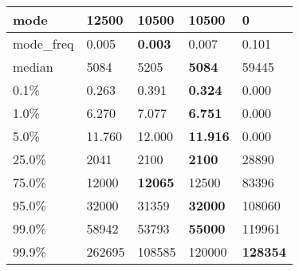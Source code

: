 \begin{table}[H]
\begin{tabular}{|l|m{10em}|m{10em}|m{10em}|m{10em}|}
\hline mode & 12500 & \bfseries 10500 & \bfseries 10500 & \cellcolor[rgb]{0.9, 0.54, 0.52} 0 \\
\hline mode\_freq & 0.005 & \bfseries 0.003 & 0.007 & \cellcolor[rgb]{0.9, 0.54, 0.52} 0.101 \\
\hline median & 5084 & 5205 & \bfseries 5084 & \cellcolor[rgb]{0.9, 0.54, 0.52} 59445 \\
\hline 0.1\% & 0.263 & 0.391 & \bfseries 0.324 & \cellcolor[rgb]{0.9, 0.54, 0.52} 0.000 \\
\hline 1.0\% & 6.270 & 7.077 & \bfseries 6.751 & \cellcolor[rgb]{0.9, 0.54, 0.52} 0.000 \\
\hline 5.0\% & 11.760 & 12.000 & \bfseries 11.916 & \cellcolor[rgb]{0.9, 0.54, 0.52} 0.000 \\
\hline 25.0\% & 2041 & 2100 & \bfseries 2100 & \cellcolor[rgb]{0.9, 0.54, 0.52} 28890 \\
\hline 75.0\% & 12000 & \bfseries 12065 & 12500 & \cellcolor[rgb]{0.9, 0.54, 0.52} 83396 \\
\hline 95.0\% & 32000 & 31359 & \bfseries 32000 & \cellcolor[rgb]{0.9, 0.54, 0.52} 108060 \\
\hline 99.0\% & 58942 & 53793 & \bfseries 55000 & \cellcolor[rgb]{0.9, 0.54, 0.52} 119961 \\
\hline 99.9\% & 262695 & \cellcolor[rgb]{0.9, 0.54, 0.52} 108585 & 120000 & \bfseries 128354 \\
\hline
\end{tabular}
\end{table}

